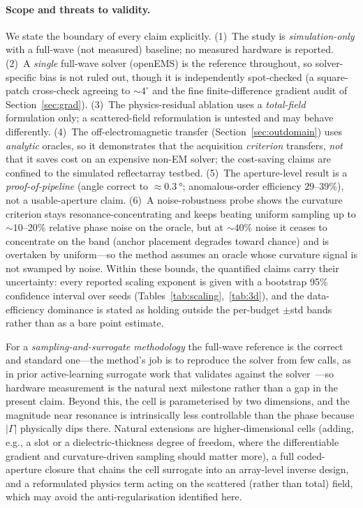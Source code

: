\documentclass[11pt]{article}
\begin{document}
\paragraph{Scope and threats to validity.} We state the boundary of every claim explicitly. (1)~The
study is \emph{simulation-only} with a full-wave (not measured) baseline; no measured hardware is reported.
(2)~A \emph{single} full-wave solver (openEMS) is the reference throughout, so solver-specific bias is not
ruled out, though it is independently spot-checked (a square-patch cross-check agreeing to $\sim\!4^\circ$
and the fine finite-difference gradient audit of Section~\ref{sec:grad}). (3)~The physics-residual ablation
uses a \emph{total-field} formulation only; a scattered-field reformulation is untested and may behave
differently. (4)~The off-electromagnetic transfer (Section~\ref{sec:outdomain}) uses \emph{analytic}
oracles, so it demonstrates that the acquisition \emph{criterion} transfers, \emph{not} that it saves cost
on an expensive non-EM solver; the cost-saving claims are confined to the simulated reflectarray testbed.
(5)~The aperture-level result is a \emph{proof-of-pipeline} (angle correct to $\approx\!\SI{0.3}{\degree}$;
anomalous-order efficiency $29$--$39\%$), not a usable-aperture claim. (6)~A noise-robustness probe shows
the curvature criterion stays resonance-concentrating and keeps beating uniform sampling up to
$\sim\!10$--$20\%$ relative phase noise on the oracle, but at $\sim\!40\%$ noise it ceases to concentrate on
the band (anchor placement degrades toward chance) and is overtaken by uniform---so the method assumes an
oracle whose curvature signal is not swamped by noise. Within these bounds, the quantified
claims carry their uncertainty: every reported scaling exponent is given with a bootstrap 95\% confidence
interval over seeds (Tables~\ref{tab:scaling},~\ref{tab:3d}), and the data-efficiency dominance is stated as
holding outside the per-budget $\pm$std bands rather than as a bare point estimate.

For a \emph{sampling-and-surrogate methodology} the full-wave reference is the correct and standard one---the
method's job is to reproduce the solver from few calls, as in prior active-learning surrogate work
that validates against the solver~\cite{pestourie2020}---so hardware measurement is the natural next
milestone rather than a gap in the present claim. Beyond this, the cell is parameterised by two
dimensions, and the magnitude near resonance is intrinsically less controllable than the phase because
$|\Gamma|$ physically dips there. Natural extensions are higher-dimensional cells (adding, e.g., a slot
or a dielectric-thickness degree of freedom, where the differentiable gradient and curvature-driven
sampling should matter more), a full coded-aperture closure that chains the cell surrogate into an
array-level inverse design, and a reformulated physics term acting on the scattered (rather than total)
field, which may avoid the anti-regularisation identified here.
\end{document}
